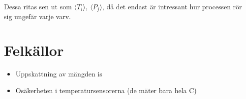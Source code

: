\documentclass[11pt]{article}
\begin{document}
Dessa ritas sen ut som $\langle T_i \rangle, \ \langle P_j \rangle$, då det endast är intressant hur processen rör sig ungefär varje varv.

\section{Felkällor}

\begin{itemize}
    \item Uppskattning av mängden is
    \item Osäkerheten i temperatursensorerna (de mäter bara hela \degree C)
\end{itemize}
\end{document}
